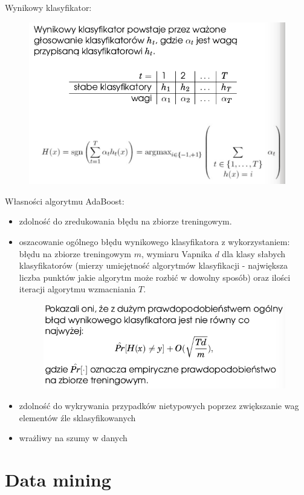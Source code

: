 \documentclass[10pt,a4paper]{article}
\begin{document}
Wynikowy klasyfikator:
\begin{figure}[H]
  \centering
    \includegraphics[scale=0.50]{images/wynik.png}
\end{figure}
Własności algorytmu AdaBoost:
\begin{itemize}
  \item zdolność do zredukowania błędu na zbiorze treningowym.
  \item oszacowanie ogólnego błędu wynikowego klasyfikatora z wykorzystaniem: błędu na zbiorze treningowym $m$, wymiaru Vapnika $d$ dla klasy słabych klasyfikatorów (mierzy umiejętność algorytmów klasyfikacji - największa liczba punktów jakie algorytm może rozbić w dowolny sposób) oraz ilości iteracji algorytmu wzmacniania $T$.
  \begin{figure}[H]
    \centering
      \includegraphics[scale=0.50]{images/praw.png}
  \end{figure}
  \item zdolność do wykrywania przypadków nietypowych poprzez zwiększanie wag elementów źle sklasyfikowanych
  \item wrażliwy na szumy w danych
\end{itemize}
\section{Data mining}
\end{document}
